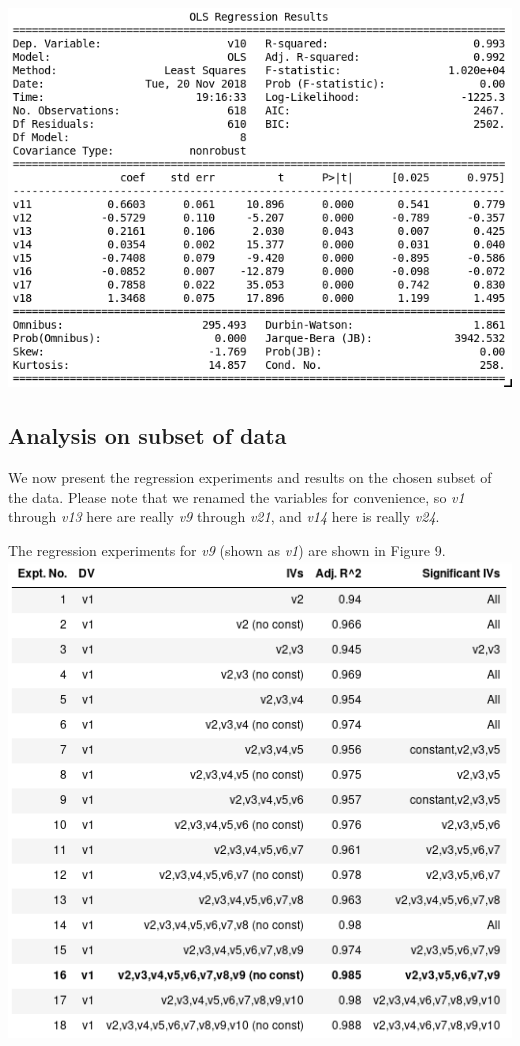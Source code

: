 \documentclass[12pt,a4paper]{article}
\begin{document}
\includegraphics[scale=0.5]{v10_exp.png}
\begingroup
{}
\endgroup

\subsection{Analysis on subset of data}
We now present the regression experiments and results on the chosen subset of the data. Please note that we renamed the variables for convenience, so \textit{v1} through \textit{v13} here are really \textit{v9} through \textit{v21}, and \textit{v14} here is really \textit{v24}.

The regression experiments for \textit{v9} (shown as \textit{v1}) are shown in Figure 9.\\

\includegraphics[scale=0.5]{v1_sub_reg.png}
\begingroup
{}
\endgroup
\hfill\break
\end{document}
